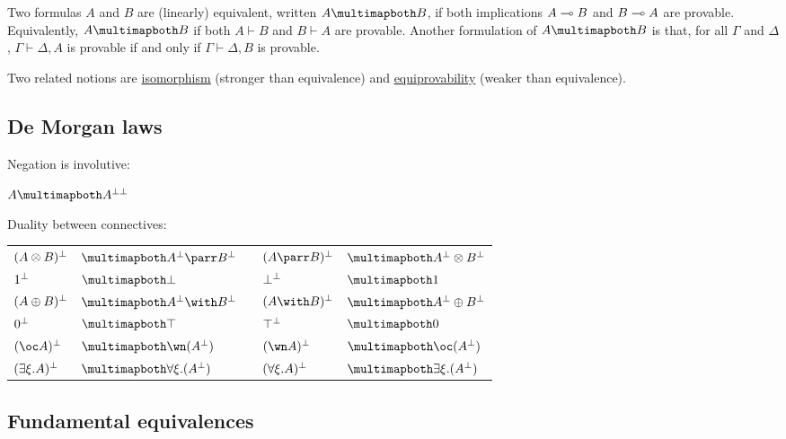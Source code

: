 Two formulas \(A\) and \(B\) are (linearly) equivalent, written
\(A\linequiv B\), if both implications \(A\multimap B\) and \(B\multimap A\) are
provable. Equivalently, \(A\linequiv B\) if both \(A\vdash B\) and
\(B\vdash A\) are provable. Another formulation of \(A\linequiv B\) is
that, for all \(\Gamma\) and \(\Delta\), \(\Gamma\vdash\Delta,A\) is
provable if and only if \(\Gamma\vdash\Delta,B\) is provable.

Two related notions are \hyperref[isomorphism]{isomorphism} (stronger than equivalence)
and \hyperref[equiprovability]{equiprovability} (weaker than equivalence).

\subsection{De Morgan laws}\label{de-morgan-laws}

Negation is involutive:

\begin{description}
\tightlist
\item[]
\(A\linequiv A\biorth\)
\end{description}

Duality between connectives:

\begin{longtable}[]{@{}lllll@{}}
\toprule
\(( A \otimes B )^\bot\) & \(\linequiv A\orth \parr B\orth\) & &
\(( A \parr B )\orth\) &
\(\linequiv A\orth \tens B\orth\)\tabularnewline
\(1^\bot\) & \(\linequiv \bot\) & & \(\bot^\bot\) &
\(\linequiv \one\)\tabularnewline
\(( A \oplus B )^\bot\) & \(\linequiv A\orth \with B\orth\) & &
\(( A \with B )\orth\) &
\(\linequiv A\orth \plus B\orth\)\tabularnewline
\(0^\bot\) & \(\linequiv \top\) & & \(\top^\bot\) &
\(\linequiv \zero\)\tabularnewline
\(( \oc A )\orth\) & \(\linequiv \wn ( A\orth )\) & & \(( \wn A )\orth\)
& \(\linequiv \oc ( A\orth )\)\tabularnewline
\(( \exists \xi.A )^\bot\) & \(\linequiv \forall \xi.( A\orth )\) & &
\(( \forall \xi.A )^\bot\) &
\(\linequiv \exists \xi.( A\orth )\)\tabularnewline
\bottomrule
\end{longtable}

\subsection{Fundamental equivalences}\label{fundamental-equivalences}

